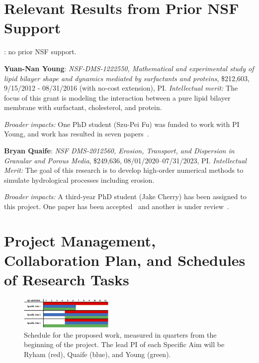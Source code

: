 \section{Relevant Results from Prior NSF Support}
: no prior NSF support.

\noindent
{\bf Yuan-Nan Young}: {\em NSF-DMS-1222550, Mathematical and
experimental study of lipid bilayer shape and dynamics mediated by
surfactants and proteins}, \$212,603, 9/15/2012 - 08/31/2016 (with
no-cost extension), PI. {\em Intellectual merit:} The focus of this
grant is modeling the interaction between a pure lipid bilayer membrane
with surfactant, cholesterol, and protein.

\noindent
{\it Broader impacts:} 
One PhD student (Szu-Pei Fu) was funded to work with PI Young, and work
has resulted in seven papers~\cite{Nganguia2013_PoF, Nganguia2013_PRE,
Young2014_JFM, Young2015_PoF, Nganguia2015_CiCP, Pak2015_PNAS,
fu2015pre}. 

\noindent
{\bf Bryan Quaife}: {\em NSF DMS-2012560, Erosion, Transport, and
Dispersion in Granular and Porous Media}, \$249,636,
08/01/2020--07/31/2023, PI. {\em Intellectual Merit:} The goal of this
research is to develop high-order numerical methods to
simulate hydrological processes including erosion.

\noindent
{\it Broader impacts:} 
A third-year PhD student (Jake Cherry) has been assigned to this
project. One paper has been accepted~\cite{che-lin-her-qua2022} and
another is under review~\cite{moo-che-chi-qua2022}.

\section{Project Management, Collaboration Plan, and Schedules of
Research Tasks}
\setlength{\parindent}{0pt}

\begin{figure}
  \vspace{-5pt}
  \includegraphics[width=0.4\textwidth]{figures/gantt.jpg}
  \vspace{-20pt}
  \caption{\label{fig:schedule} \footnotesize Schedule for the proposed
  work, measured in quarters from the beginning of the project. The lead
  PI of each Specific Aim will be Ryham (red), Quaife (blue), and Young
  (green).}
\end{figure}


